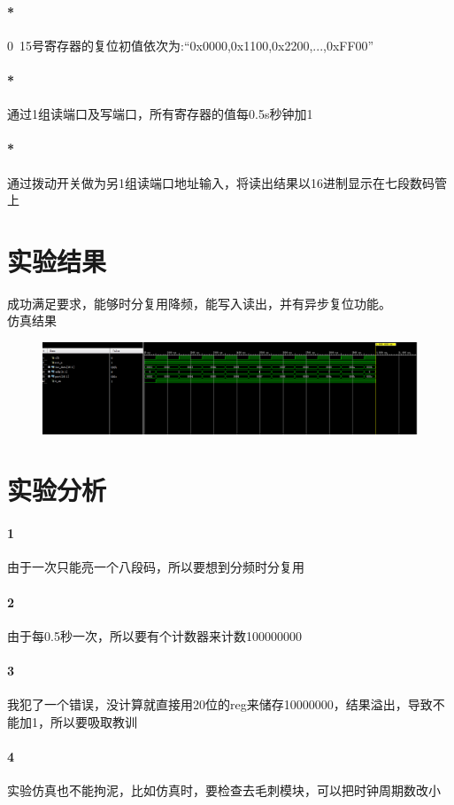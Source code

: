 \documentclass[UTF8]{ctexart}
\begin{document}
\paragraph{*}0~15号寄存器的复位初值依次为:“0x0000,0x1100,0x2200,...,0xFF00”
\paragraph{*}通过1组读端口及写端口，所有寄存器的值每0.5s秒钟加1
\paragraph{*}通过拨动开关做为另1组读端口地址输入，将读出结果以16进制显示在七段数码管上

\section{实验结果}
成功满足要求，能够时分复用降频，能写入读出，并有异步复位功能。\\
仿真结果
\begin{figure}[H]
  \centering
  \includegraphics[width=1\textwidth]{inc.png}
\end{figure}


\section{实验分析}
\paragraph{1}由于一次只能亮一个八段码，所以要想到分频时分复用
\paragraph{2}由于每0.5秒一次，所以要有个计数器来计数100000000
\paragraph{3}我犯了一个错误，没计算就直接用20位的reg来储存10000000，结果溢出，导致不能加1，所以要吸取教训
\paragraph{4}实验仿真也不能拘泥，比如仿真时，要检查去毛刺模块，可以把时钟周期数改小
\end{document}
